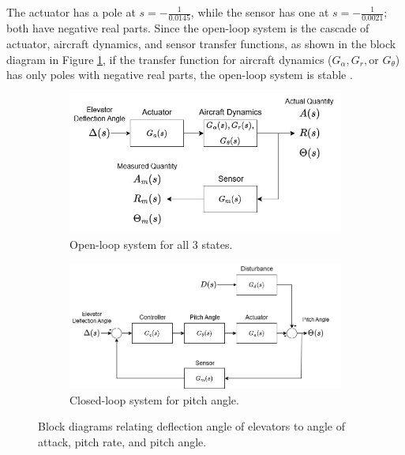 \documentclass[9pt,a4paper]{article}
\begin{document}
    \noindent The actuator has a pole at $s = -\frac{1}{0.0145}$, while the sensor has one at $s=-\frac{1}{0.0021}$; both have negative real parts. Since the open-loop system is the cascade of actuator, aircraft dynamics, and sensor transfer functions, as shown in the block diagram in Figure \ref{fig:ol_blockDiagram}, if the transfer function for aircraft dynamics ($G_{\alpha}, G_{r}, \text{or } G_{\theta}$) has only poles with negative real parts, the open-loop system is stable \cite[Theorem 9.9]{textbook}.
    \begin{figure}[h]
        \begin{subfigure}[h]{0.5\textwidth}
            \centering
            \includegraphics[width = \textwidth]{../block_diagrams/ELE2038_H5_openLoopBlockDiagram.drawio.jpg}
            \caption{Open-loop system for all 3 states.}
            \label{fig:ol_blockDiagram}            
        \end{subfigure}%
        \begin{subfigure}[h]{0.5\textwidth}
            \centering
            \includegraphics[width = \textwidth]{../block_diagrams/ELE2038_H5_closedLoopBlockDiagram.drawio.jpg}
            \caption{Closed-loop system for pitch angle.}
            \label{fig:cl_blockDiagram}
        \end{subfigure}
    \caption{Block diagrams relating deflection angle of elevators to angle of attack, pitch rate, and pitch angle.}
    \end{figure}
    
\end{document}
